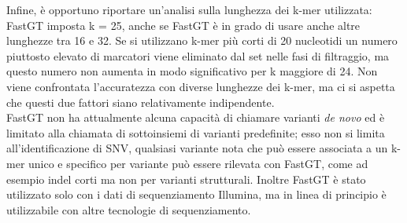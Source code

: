 \documentclass[../main.tex]{subfiles}
\begin{document}
Infine, è opportuno riportare un'analisi sulla lunghezza dei k-mer utilizzata: FastGT imposta k = 25, anche se FastGT è in grado di usare anche altre lunghezze tra 16 e 32. Se si utilizzano k-mer più corti di 20 nucleotidi un numero piuttosto elevato di marcatori viene eliminato dal set nelle fasi di filtraggio, ma questo numero non aumenta in modo significativo per k maggiore di 24. Non viene confrontata l'accuratezza con diverse lunghezze dei k-mer, ma ci si aspetta che questi due fattori siano relativamente indipendente. \\

\noindent
FastGT non ha attualmente alcuna capacità di chiamare varianti \textit{de novo} ed è limitato alla chiamata di sottoinsiemi di varianti predefinite; esso non si limita all'identificazione di SNV, qualsiasi variante nota che può essere associata a un k-mer unico e specifico per variante può essere rilevata con FastGT, come ad esempio indel corti ma non per varianti strutturali. Inoltre FastGT è stato utilizzato solo con i dati di sequenziamento Illumina, ma in linea di principio è utilizzabile con altre tecnologie di sequenziamento.
\end{document}

